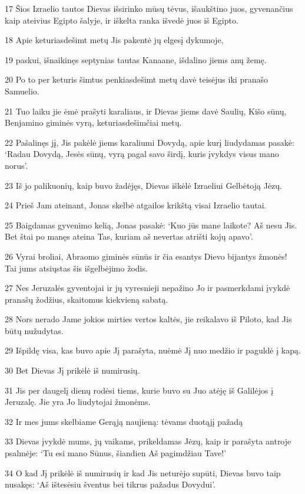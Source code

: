 \par 17 Šios Izraelio tautos Dievas išsirinko mūsų tėvus, išaukštino juos, gyvenančius kaip ateivius Egipto šalyje, ir iškelta ranka išvedė juos iš Egipto. 
\par 18 Apie keturiasdešimt metų Jis pakentė jų elgesį dykumoje, 
\par 19 paskui, išnaikinęs septynias tautas Kanaane, išdalino jiems anų žemę. 
\par 20 Po to per keturis šimtus penkiasdešimt metų davė teisėjus iki pranašo Samuelio. 
\par 21 Tuo laiku jie ėmė prašyti karaliaus, ir Dievas jiems davė Saulių, Kišo sūnų, Benjamino giminės vyrą, keturiasdešimčiai metų. 
\par 22 Pašalinęs jį, Jis pakėlė jiems karaliumi Dovydą, apie kurį liudydamas pasakė: ‘Radau Dovydą, Jesės sūnų, vyrą pagal savo širdį, kuris įvykdys visus mano norus’. 
\par 23 Iš jo palikuonių, kaip buvo žadėjęs, Dievas iškėlė Izraeliui Gelbėtoją Jėzų. 
\par 24 Prieš Jam ateinant, Jonas skelbė atgailos krikštą visai Izraelio tautai. 
\par 25 Baigdamas gyvenimo kelią, Jonas pasakė: ‘Kuo jūs mane laikote? Aš nesu Jis. Bet štai po manęs ateina Tas, kuriam aš nevertas atrišti kojų apavo’. 
\par 26 Vyrai broliai, Abraomo giminės sūnūs ir čia esantys Dievo bijantys žmonės! Tai jums atsiųstas šis išgelbėjimo žodis. 
\par 27 Nes Jeruzalės gyventojai ir jų vyresnieji nepažino Jo ir pasmerkdami įvykdė pranašų žodžius, skaitomus kiekvieną sabatą. 
\par 28 Nors nerado Jame jokios mirties vertos kaltės, jie reikalavo iš Piloto, kad Jis būtų nužudytas. 
\par 29 Išpildę visa, kas buvo apie Jį parašyta, nuėmė Jį nuo medžio ir paguldė į kapą. 
\par 30 Bet Dievas Jį prikėlė iš numirusių. 
\par 31 Jis per daugelį dienų rodėsi tiems, kurie buvo su Juo atėję iš Galilėjos į Jeruzalę. Jie yra Jo liudytojai žmonėms. 
\par 32 Ir mes jums skelbiame Gerąją naujieną: tėvams duotąjį pažadą 
\par 33 Dievas įvykdė mums, jų vaikams, prikeldamas Jėzų, kaip ir parašyta antroje psalmėje: ‘Tu esi mano Sūnus, šiandien Aš pagimdžiau Tave!’ 
\par 34 O kad Jį prikėlė iš numirusių ir kad Jis neturėjo supūti, Dievas buvo taip nusakęs: ‘Aš ištesėsiu šventus bei tikrus pažadus Dovydui’. 
